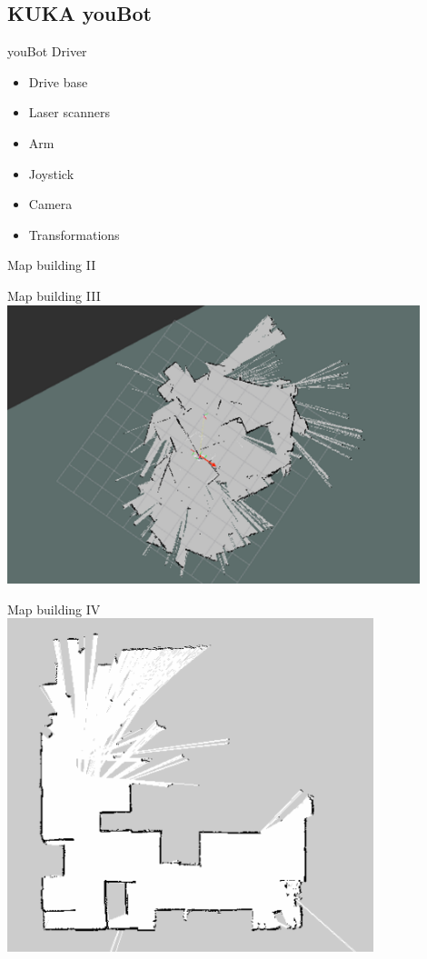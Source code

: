 \subsection{KUKA youBot}
\begin{frame}{youBot Driver}
    \begin{itemize}
        \item Drive base
        \item Laser scanners
        \item Arm 
        \item Joystick
        \item Camera
        \item Transformations
        
    \end{itemize}
\end{frame}
\begin{frame}{Map building II}
\end{frame}
\begin{frame}{Map building III}
    \centering
    \includegraphics[width=0.9\textwidth]{gfx/map_messy.png}
\end{frame}
\begin{frame}{Map building IV}
\centering
\includegraphics[width=0.8\textwidth]{gfx/map.png}
\end{frame}
